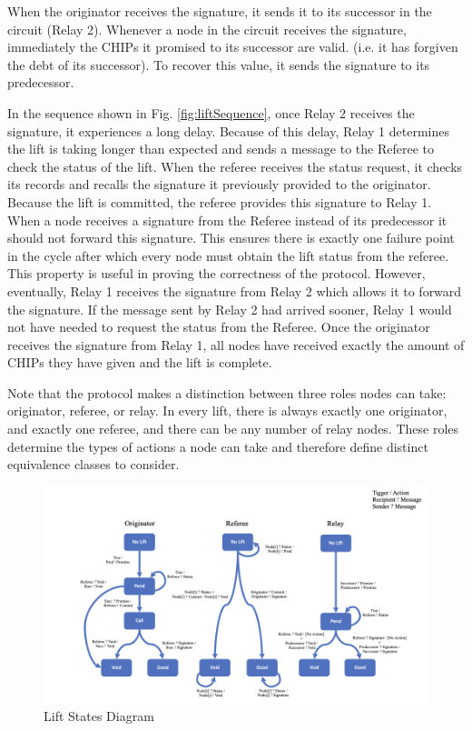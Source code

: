 \documentclass[runningheads]{llncs}
\begin{document}
When the originator receives the signature, it sends it to its successor in the circuit (Relay 2). Whenever a node in the circuit receives the signature, immediately the CHIPs it promised to its successor are valid. (i.e. it has forgiven the debt of its successor). 
To recover this value, it sends the signature to its predecessor.

In the sequence shown in Fig. \ref{fig:liftSequence}, once Relay 2 receives the signature, it experiences a long delay. Because of this delay, Relay 1 determines the lift is taking longer than expected and sends a message to the Referee to check the status of the lift. When the referee receives the status request, it checks its records and recalls the signature it previously provided to the originator. Because the lift is committed, the referee provides this signature to Relay 1. When a node receives a signature from the Referee instead of its predecessor it should not forward this signature. This ensures there is exactly one failure point in the cycle after which every node must obtain the lift status from the referee. This property is useful in proving the correctness of the protocol. However, eventually, Relay 1 receives the signature from Relay 2 which allows it to forward the signature. If the message sent by Relay 2 had arrived sooner, Relay 1 would not have needed to request the status from the Referee. Once the originator receives the signature from Relay 1, all nodes have received exactly the amount of CHIPs they have given and the lift is complete.

Note that the protocol makes a distinction between three roles nodes can take: originator, referee, or relay. In every lift, there is always exactly one originator, and exactly one referee, and there can be any number of relay nodes. These roles determine the types of actions a node can take and therefore define distinct equivalence classes to consider. 

\begin{figure}
    \centering
    \includegraphics[scale=0.44]{LiftStatesSeperate.png}
    \caption{Lift States Diagram}
    \label{fig:liftStates}
\end{figure}
\end{document}
